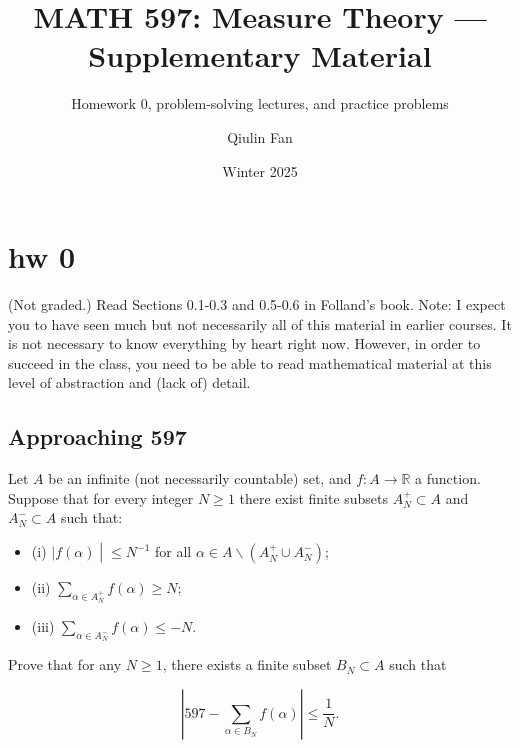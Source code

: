 \documentclass{qlnotes-export}
\title{MATH 597: Measure Theory --- Supplementary Material}
\subtitle{Homework 0, problem-solving lectures, and practice problems}
\author{Qiulin Fan}
\date{Winter 2025}
\begin{document}
\mainmatter
\chapter{hw 0}\label{hw-0}

(Not graded.) Read Sections 0.1-0.3 and 0.5-0.6 in Folland's book. Note: I expect you to have seen much but not necessarily all of this material in earlier courses. It is not necessary to know everything by heart right now. However, in order to succeed in the class, you need to be able to read mathematical material at this level of abstraction and (lack of) detail.

\section{Approaching 597}\label{approaching-597}

Let \(A\) be an infinite (not necessarily countable) set, and \(f:A\rightarrow{\mathbb{R}}\) a function. Suppose that for every integer \(N \geq 1\) there exist finite subsets \(A_{N}^{+} \subset A\) and \(A_{N}^{-} \subset A\) such that:

\begin{itemize}
\item
  (i) \(\left. |f(\alpha) \middle| \leq N^{- 1} \right.\) for all \(\alpha \in A\backslash(A_{N}^{+} \cup A_{N}^{-})\);
\item
  (ii) \(\sum_{\alpha \in A_{N}^{+}}f(\alpha) \geq N\);
\item
  (iii) \(\sum_{\alpha \in A_{N}^{-}}f(\alpha) \leq - N\).
\end{itemize}

Prove that for any \(N \geq 1\), there exists a finite subset \(B_{N} \subset A\) such that

\[\left| {597 - \sum\limits_{\alpha \in B_{N}}f(\alpha)} \right| \leq \frac{1}{N}.\]
\end{document}
